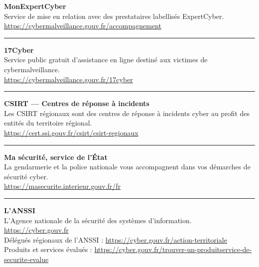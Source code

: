 \documentclass[11pt,a4paper]{article}
\newcommand{\sectionruleline}{%
	\vspace{0.3em}
	\textcolor{sectionrule}{\rule{\linewidth}{0.8pt}}
	\vspace{0.3em}
}
\begin{document}
	\begin{tcolorbox}[
		breakable,
		enhanced,
		colback=lightgray,
		colframe=esieadarkblue,
		arc=4pt,
		boxrule=0.8pt,
		title={\sffamily\bfseries\color{white} Contacts et ressources utiles},
		colbacktitle=esieadarkblue,
		fonttitle=\sffamily\bfseries,
		left=6pt, right=6pt, top=4pt, bottom=4pt
		]
		\small
		
		\textbf{\faLock\enskip MonExpertCyber}\\
		Service de mise en relation avec des prestataires labellisés ExpertCyber.\\
		\href{https://cybermalveillance.gouv.fr/accompagnement}{https://cybermalveillance.gouv.fr/accompagnement}
		
		\vspace{3pt}\sectionruleline
		
		\textbf{\faPhone\enskip 17Cyber}\\
		Service public gratuit d'assistance en ligne destiné aux victimes de cybermalveillance.\\
		\href{https://cybermalveillance.gouv.fr/17cyber}{https://cybermalveillance.gouv.fr/17cyber}
		
		\vspace{3pt}\sectionruleline
		
		\textbf{\faServer\enskip CSIRT — Centres de réponse à incidents}\\
		Les CSIRT régionaux sont des centres de réponse à incidents cyber au profit des entités du territoire régional.\\
		\href{https://cert.ssi.gouv.fr/csirt/csirt-regionaux}{https://cert.ssi.gouv.fr/csirt/csirt-regionaux}
		
		\vspace{3pt}\sectionruleline
		
		\textbf{\faUniversity\enskip Ma sécurité, service de l'État}\\
		La gendarmerie et la police nationale vous accompagnent dans vos démarches de sécurité cyber.\\
		\href{https://masecurite.interieur.gouv.fr/fr}{https://masecurite.interieur.gouv.fr/fr}
		
		\vspace{3pt}\sectionruleline
		
		\textbf{\faBuilding\enskip L'ANSSI}\\
		L'Agence nationale de la sécurité des systèmes d'information.\\
		\href{https://cyber.gouv.fr}{https://cyber.gouv.fr}\\
		Délégués régionaux de l'ANSSI : \href{https://cyber.gouv.fr/action-territoriale}{https://cyber.gouv.fr/action-territoriale}\\
		Produits et services évalués : \href{https://cyber.gouv.fr/trouver-un-produitservice-de-securite-evalue}{https://cyber.gouv.fr/trouver-un-produitservice-de-securite-evalue}
		

\end{tcolorbox}
\end{document}
